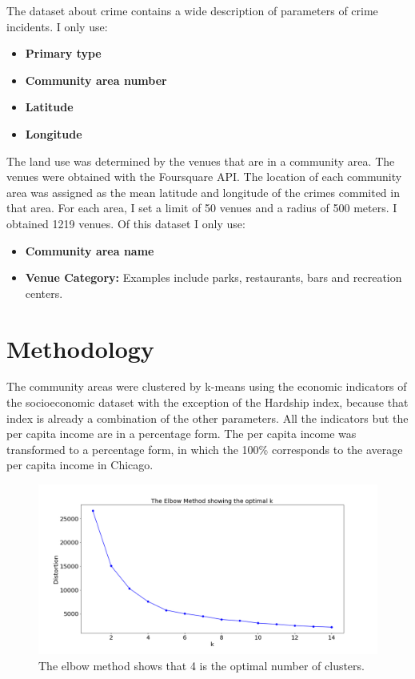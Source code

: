 \documentclass[a4paper,12pt]{article}
\begin{document}
The dataset about crime contains a wide description of parameters of crime incidents. I only use:
\begin{itemize}
\item \textbf{Primary type}
\item \textbf{Community area number}
\item \textbf{Latitude}
\item \textbf{Longitude}
\end{itemize}

The land use was determined by the venues that are in a community area. The venues were obtained with the Foursquare API. The location of each community area was assigned as the mean latitude and longitude of the crimes commited in that area. For each area, I set a limit of 50 venues and a radius of 500 meters. I obtained 1219 venues. Of this dataset I only use:
\begin{itemize}
\item \textbf{Community area name}
\item \textbf{Venue Category:} Examples include parks, restaurants, bars and recreation centers.
\end{itemize}  

\section{Methodology}
The community areas were clustered by k-means using the economic indicators of the socioeconomic dataset with the exception of the Hardship index, because that index is already a combination of the other parameters. All the indicators but the per capita income are in a percentage form. The per capita income was transformed to a percentage form, in which the 100\% corresponds to the average per capita income in Chicago. 


\begin{figure}[ht]
 \centering
\includegraphics[scale=0.4]{Elbow_method}
\caption{The elbow method shows that 4 is the optimal number of clusters. 
\label{fig:elbow}}
\end{figure} 
\end{document}
